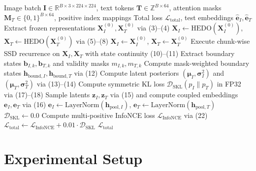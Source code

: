 \documentclass[11pt,journal,onecolumn,draftcls]{IEEEtran}
\begin{document}
\begin{algorithm}[t]
\caption{HEDO-HVSC Forward Pass and Training Step}
\label{alg:hedo_hvsc}
\begin{algorithmic}[1]
\REQUIRE Image batch $\mathbf{I} \in \mathbb{R}^{B \times 3 \times 224 \times 224}$, text tokens $\mathbf{T} \in \mathbb{Z}^{B \times 64}$, attention masks $\mathbf{M}_T \in \{0, 1\}^{B \times 64}$, positive index mappings
\ENSURE Total loss $\mathcal{L}_{\text{total}}$, test embeddings $\hat{\mathbf{e}}_I, \hat{\mathbf{e}}_T$
\STATE Extract frozen representations $\mathbf{X}_I^{(0)}, \mathbf{X}_T^{(0)}$ via (3)--(4)
    \STATE $\mathbf{X}_I \leftarrow \text{HEDO}(\mathbf{X}_I^{(0)})$, $\mathbf{X}_T \leftarrow \text{HEDO}(\mathbf{X}_T^{(0)})$ via (5)--(8)
\ELSE
    \STATE $\mathbf{X}_I \leftarrow \mathbf{X}_I^{(0)}$, $\mathbf{X}_T \leftarrow \mathbf{X}_T^{(0)}$
\ENDIF
\STATE Execute chunk-wise SSD recurrence on $\mathbf{X}_I, \mathbf{X}_T$ with state continuity (10)--(11)
\STATE Extract boundary states $\mathbf{b}_{I, k}, \mathbf{b}_{T, k}$ and validity masks $m_{I, k}, m_{T, k}$
    \STATE Compute mask-weighted boundary states $\mathbf{h}_{\text{bound}, I}, \mathbf{h}_{\text{bound}, T}$ via (12)
    \STATE Compute latent posteriors $(\boldsymbol{\mu}_I, \boldsymbol{\sigma}_I^2)$ and $(\boldsymbol{\mu}_T, \boldsymbol{\sigma}_T^2)$ via (13)--(14)
    \STATE Compute symmetric KL loss $\mathcal{D}_{\text{SKL}}(p_I \parallel p_T)$ in FP32 via (17)--(18)
    \STATE Sample latents $\mathbf{z}_I, \mathbf{z}_T$ via (15) and compute coupled embeddings $\mathbf{e}_I, \mathbf{e}_T$ via (16)
\ELSE
    \STATE $\mathbf{e}_I \leftarrow \text{LayerNorm}(\mathbf{h}_{\text{pool}, I})$, $\mathbf{e}_T \leftarrow \text{LayerNorm}(\mathbf{h}_{\text{pool}, T})$
    \STATE $\mathcal{D}_{\text{SKL}} \leftarrow 0.0$
\ENDIF
\STATE Compute multi-positive InfoNCE loss $\mathcal{L}_{\text{InfoNCE}}$ via (22)
\STATE $\mathcal{L}_{\text{total}} \leftarrow \mathcal{L}_{\text{InfoNCE}} + 0.01 \cdot \mathcal{D}_{\text{SKL}}$
\RETURN $\mathcal{L}_{\text{total}}$
\end{algorithmic}
\end{algorithm}

\section{Experimental Setup}
\label{sec:experimental_setup}
\end{document}
